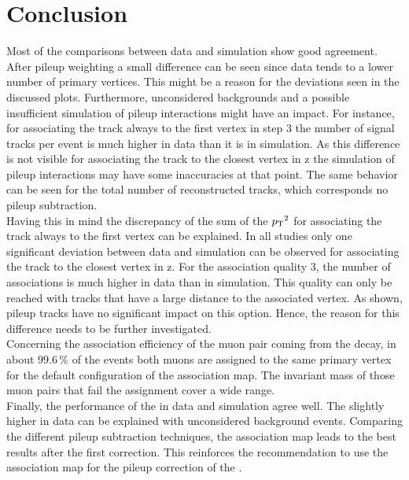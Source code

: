 \section{Conclusion}

Most of the comparisons between data and simulation show good agreement. After pileup weighting a small difference can be seen since data tends to a lower number of primary vertices. This might be a reason for the deviations seen in the discussed plots. Furthermore, unconsidered backgrounds and a possible insufficient simulation of pileup interactions might have an impact. For instance, for associating the track always to the first vertex in step 3 the number of signal tracks per event is much higher in data than it is in simulation. As this difference is not visible for associating the track to the closest vertex in z the simulation of pileup interactions may have some inaccuracies at that point. The same behavior can be seen for the total number of reconstructed tracks, which corresponds no pileup subtraction.\\
Having this in mind the discrepancy of the sum of the $p_{\mathrm{T}}{}^{2}$ for associating the track always to the first vertex can be explained. In all studies only one significant deviation between data and simulation can be observed for associating the track to the closest vertex in z. For the association quality 3, the number of associations is much higher in data than in simulation. This quality can only be reached with tracks that have a large distance to the associated vertex. As shown, pileup tracks have no significant impact on this option. Hence, the reason for this difference needs to be further investigated.\\
Concerning the association efficiency of the muon pair coming from the \Zz decay, in about $99.6\,\%$ of the events both muons are assigned to the same primary vertex for the default configuration of the association map. The invariant mass of those muon pairs that fail the assignment cover a wide range. \\
Finally, the performance of the \MET{} in data and simulation agree well. The slightly higher \MET{} in data can be explained with unconsidered background events. Comparing the different pileup subtraction techniques, the association map leads to the best results after the first correction. This reinforces the recommendation to use the association map for the pileup correction of the \MET{}.
